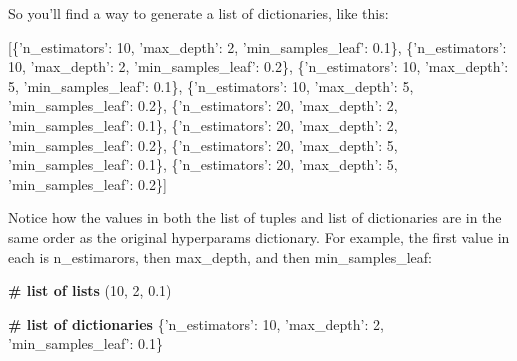 \documentclass[11pt]{article}
\newenvironment{Shaded}{}{}
\newcommand{\DecValTok}[1]{\textcolor[rgb]{0.25,0.63,0.44}{{#1}}}
\newcommand{\FloatTok}[1]{\textcolor[rgb]{0.25,0.63,0.44}{{#1}}}
\newcommand{\CharTok}[1]{\textcolor[rgb]{0.25,0.44,0.63}{{#1}}}
\newcommand{\ErrorTok}[1]{\textcolor[rgb]{1.00,0.00,0.00}{\textbf{{#1}}}}
\newcommand{\NormalTok}[1]{{#1}}
\begin{document}
So you'll find a way to generate a list of dictionaries, like this:

\begin{Shaded}
\begin{Highlighting}[]
\NormalTok{[\{}\CharTok{'n_estimators'}\NormalTok{: }\DecValTok{10}\NormalTok{, }\CharTok{'max_depth'}\NormalTok{: }\DecValTok{2}\NormalTok{, }\CharTok{'min_samples_leaf'}\NormalTok{: }\FloatTok{0.1}\NormalTok{\},}
\NormalTok{ \{}\CharTok{'n_estimators'}\NormalTok{: }\DecValTok{10}\NormalTok{, }\CharTok{'max_depth'}\NormalTok{: }\DecValTok{2}\NormalTok{, }\CharTok{'min_samples_leaf'}\NormalTok{: }\FloatTok{0.2}\NormalTok{\},}
\NormalTok{ \{}\CharTok{'n_estimators'}\NormalTok{: }\DecValTok{10}\NormalTok{, }\CharTok{'max_depth'}\NormalTok{: }\DecValTok{5}\NormalTok{, }\CharTok{'min_samples_leaf'}\NormalTok{: }\FloatTok{0.1}\NormalTok{\},}
\NormalTok{ \{}\CharTok{'n_estimators'}\NormalTok{: }\DecValTok{10}\NormalTok{, }\CharTok{'max_depth'}\NormalTok{: }\DecValTok{5}\NormalTok{, }\CharTok{'min_samples_leaf'}\NormalTok{: }\FloatTok{0.2}\NormalTok{\},}
\NormalTok{ \{}\CharTok{'n_estimators'}\NormalTok{: }\DecValTok{20}\NormalTok{, }\CharTok{'max_depth'}\NormalTok{: }\DecValTok{2}\NormalTok{, }\CharTok{'min_samples_leaf'}\NormalTok{: }\FloatTok{0.1}\NormalTok{\},}
\NormalTok{ \{}\CharTok{'n_estimators'}\NormalTok{: }\DecValTok{20}\NormalTok{, }\CharTok{'max_depth'}\NormalTok{: }\DecValTok{2}\NormalTok{, }\CharTok{'min_samples_leaf'}\NormalTok{: }\FloatTok{0.2}\NormalTok{\},}
\NormalTok{ \{}\CharTok{'n_estimators'}\NormalTok{: }\DecValTok{20}\NormalTok{, }\CharTok{'max_depth'}\NormalTok{: }\DecValTok{5}\NormalTok{, }\CharTok{'min_samples_leaf'}\NormalTok{: }\FloatTok{0.1}\NormalTok{\},}
\NormalTok{ \{}\CharTok{'n_estimators'}\NormalTok{: }\DecValTok{20}\NormalTok{, }\CharTok{'max_depth'}\NormalTok{: }\DecValTok{5}\NormalTok{, }\CharTok{'min_samples_leaf'}\NormalTok{: }\FloatTok{0.2}\NormalTok{\}]}
\end{Highlighting}
\end{Shaded}

Notice how the values in both the list of tuples and list of
dictionaries are in the same order as the original hyperparams
dictionary. For example, the first value in each is n\_estimarors, then
max\_depth, and then min\_samples\_leaf:

\begin{Shaded}
\begin{Highlighting}[]
\ErrorTok{# list of lists}
\NormalTok{(}\DecValTok{10}\NormalTok{, }\DecValTok{2}\NormalTok{, }\FloatTok{0.1}\NormalTok{)}

\ErrorTok{# list of dictionaries}
\NormalTok{\{}\CharTok{'n_estimators'}\NormalTok{: }\DecValTok{10}\NormalTok{, }\CharTok{'max_depth'}\NormalTok{: }\DecValTok{2}\NormalTok{, }\CharTok{'min_samples_leaf'}\NormalTok{: }\FloatTok{0.1}\NormalTok{\}}
\end{Highlighting}
\end{Shaded}
\end{document}

